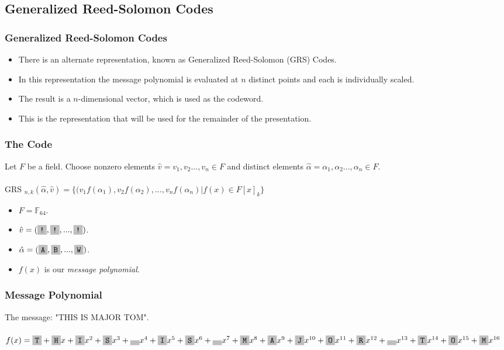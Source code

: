 \documentclass{beamer}
\begin{document}
\subsection{Generalized Reed-Solomon Codes}

\begin{frame}
	\frametitle{Generalized Reed-Solomon Codes}
	\begin{itemize}
		\item There is an alternate representation, known as Generalized Reed-Solomon (GRS) Codes.
		\item In this representation the message polynomial is evaluated at $n$ distinct points and each is individually scaled. 
		\item The result is a $n$-dimensional vector, which is used as the codeword.
		\item This is the representation that will be used for the remainder of the presentation.
	\end{itemize}
	
\end{frame}

\begin{frame}
	\frametitle{The Code}
	Let $F$ be a field. Choose nonzero elements $\hat{v} = v_{1}, v_{2}...,v_{n} \in F$ and distinct elements $\hat{\alpha} = \alpha_{1}, \alpha_{2}...,\alpha_{n} \in F$.\\~\\
	
	GRS $_{n, k}(\hat{\alpha}, \hat{v}) = \{(v_{1}f(\alpha_{1}),v_{2}f(\alpha_{2}),...,v_{n}f(\alpha_{n}) | f(x) \in F[x]_{k}\}$
	\begin{itemize}
		\item $F = \mathbb{F}_{64}$.
		\item $\hat{v} = (\f{!}, \f{!}, ..., \f{!})$.
		\item $\hat{\alpha} = (\f{A}, \f{B}, ..., \f{W})$.
		\item $f(x)$ is our \textit{message polynomial}.
	\end{itemize}
\end{frame}

\begin{frame}
	\frametitle{Message Polynomial}

	 The message: "THIS IS MAJOR TOM".\\~\\
     
	 $f(x) = \f{T} + \f{H}x + \f{I}x^{2} + \f{S}x^{3} + \f{ }x^{4} + \f{I}x^{5} + \f{S}x^{6} + \f{ }x^{7} + \f{M}x^{8} + \f{A}x^{9} + \f{J}x^{10} + \f{O}x^{11} + \f{R}x^{12} + \f{ }x^{13} + \f{T}x^{14} + \f{O}x^{15} + \f{M}x^{16}$
		

\end{frame}
\end{document}
